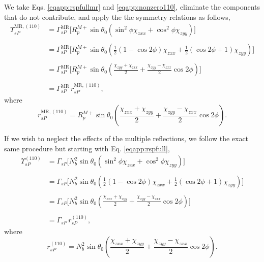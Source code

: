 We take Eqs. \eqref{eqapp:rspfullmr} and \eqref{eqapp:nonzero110}, eliminate the
components that do not contribute, and apply the the symmetry relations as
follows,
\begin{equation*}
\begin{split}
\Upsilon^{\mathrm{MR},(110)}_{sP} &=
\Gamma^{\mathrm{MR}}_{sP}
\big[
R^{M+}_{p}\sin\theta_{0}(\sin^{2}\phi\chi_{zxx} + \cos^{2}\phi\chi_{zyy})
\big]\\\\
&=
\Gamma^{\mathrm{MR}}_{sP}
\bigg[
R^{M+}_{p}\sin\theta_{0}
\left(
\frac{1}{2}(1-\cos2\phi)\chi_{zxx} + \frac{1}{2}(\cos2\phi+1)\chi_{zyy}
\right)
\bigg]\\\\
&=
\Gamma^{\mathrm{MR}}_{sP}
\bigg[
R^{M+}_{p}\sin\theta_{0}
\left(
\frac{\chi_{zyy} + \chi_{zxx}}{2} + \frac{\chi_{zyy} - \chi_{zxx}}{2}\cos2\phi
\right)
\bigg]\\\\
& = \Gamma^{\mathrm{MR}}_{sP}\,r^{\mathrm{MR},(110)}_{sP},
\end{split}
\end{equation*}
where
\begin{equation}\label{eqapp:final-rsp.mr.110}
r^{\mathrm{MR},(110)}_{sP} = 
R^{M+}_{p}\sin\theta_{0}
\left(
\frac{\chi_{zxx} + \chi_{zyy}}{2} + \frac{\chi_{zyy} - \chi_{zxx}}{2}\cos2\phi
\right).
\end{equation}

If we wish to neglect the effects of the multiple reflections, we follow the
exact same procedure but starting with Eq. \eqref{eqapp:rspfull},
\begin{equation*}
\begin{split}
\Upsilon^{(110)}_{sP} &=
\Gamma_{sP}
\big[
N^{2}_{b}\sin\theta_{0}(\sin^{2}\phi\chi_{zxx} + \cos^{2}\phi\chi_{zyy})
\big]\\\\
&=
\Gamma_{sP}
\bigg[
N^{2}_{b}\sin\theta_{0}
\left(
\frac{1}{2}(1-\cos2\phi)\chi_{zxx} + \frac{1}{2}(\cos2\phi+1)\chi_{zyy}
\right)
\bigg]\\\\
&=
\Gamma_{sP}
\bigg[
N^{2}_{b}\sin\theta_{0}
\left(
\frac{\chi_{zxx} + \chi_{zyy}}{2} + \frac{\chi_{zyy} - \chi_{zxx}}{2}\cos2\phi
\right)
\bigg]\\\\
&= \Gamma_{sP}\,r^{(110)}_{sP},
\end{split}
\end{equation*}
where
\begin{equation}\label{eqapp:final-rsp.110}
r^{(110)}_{sP} = 
N^{2}_{b}\sin\theta_{0}
\left(
\frac{\chi_{zxx} + \chi_{zyy}}{2} + \frac{\chi_{zyy} - \chi_{zxx}}{2}\cos2\phi
\right).
\end{equation}


